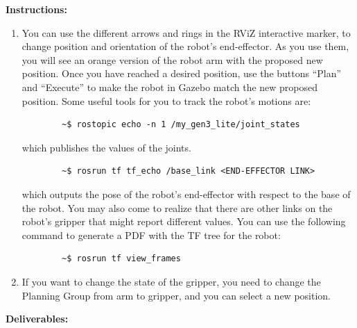 \documentclass[12pt]{article}
\begin{document}
\textbf{Instructions:}

\begin{enumerate}

    \item You can use the different arrows and rings in the RViZ interactive marker, to change position and orientation of the robot’s end-effector. As you use them, you will see an orange version of the robot arm with the proposed new position. Once you have reached a desired position, use the buttons “Plan” and “Execute” to make the robot in Gazebo match the new proposed position. Some useful tools for you to track the robot’s motions are:
    
    \begin{verbatim}
        ~$ rostopic echo -n 1 /my_gen3_lite/joint_states
    \end{verbatim}

    which publishes the values of the joints.
    
    \begin{verbatim}
        ~$ rosrun tf tf_echo /base_link <END-EFFECTOR LINK>
    \end{verbatim}
    
    which outputs the pose of the robot’s end-effector with respect to the base of the robot. You may also come to realize that there are other links on the robot’s gripper that might report different values. You can use the following command to generate a PDF with the TF tree for the robot:
    
    \begin{verbatim}
        ~$ rosrun tf view_frames
    \end{verbatim}
    
    \item If you want to change the state of the gripper, you need to change the Planning Group from arm to gripper, and you can select a new position.

\end{enumerate}

\textbf{Deliverables:}
\end{document}
